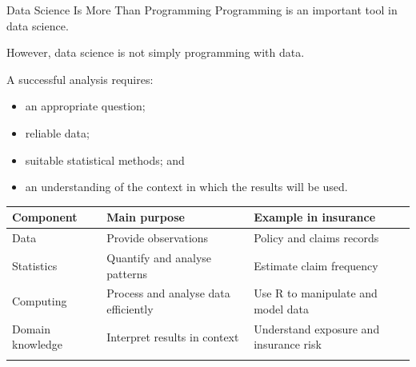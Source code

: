 \documentclass[
  ignorenonframetext,
  aspectratio=169,
]{beamer}
\newcounter{none} %
\providecommand{\tightlist}{%
  \setlength{\itemsep}{0pt}\setlength{\parskip}{0pt}}
\begin{document}
\begin{frame}{Data Science Is More Than Programming}
\protect{}\label{data-science-is-more-than-programming}
Programming is an important tool in data science.

However, data science is not simply programming with data.

A successful analysis requires:

\begin{itemize}
\tightlist
\item
  an appropriate question;
\item
  reliable data;
\item
  suitable statistical methods; and
\item
  an understanding of the context in which the results will be used.
\end{itemize}

{\def\LTcaptype{none} %
\begin{longtable}[]{@{}
  >{\raggedright\arraybackslash}p{}
  >{\raggedright\arraybackslash}p{}
  >{\raggedright\arraybackslash}p{}@{}}
\toprule\noalign{}
\begin{minipage}[b]{\linewidth}\raggedright
Component
\end{minipage} & \begin{minipage}[b]{\linewidth}\raggedright
Main purpose
\end{minipage} & \begin{minipage}[b]{\linewidth}\raggedright
Example in insurance
\end{minipage} \\
\midrule\noalign{}
\endhead
Data & Provide observations & Policy and claims records \\
Statistics & Quantify and analyse patterns & Estimate claim frequency \\
Computing & Process and analyse data efficiently & Use R to manipulate
and model data \\
Domain knowledge & Interpret results in context & Understand exposure
and insurance risk \\
\bottomrule\noalign{}
\end{longtable}
}
\end{frame}
\end{document}

